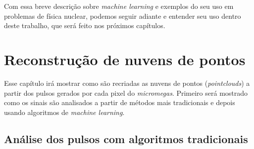 \documentclass[a4paper,12pt,oneside]{book}
\begin{document}



\par Com essa breve descrição sobre \textit{machine learning} e exemplos do seu uso em problemas de física nuclear, podemos seguir adiante e entender seu uso dentro deste trabalho, que será feito nos próximos capítulos.

\chapter{Reconstrução de nuvens de pontos}\label{sec:sinais}

\par Esse capítulo irá mostrar como são recriadas as nuvens de pontos (\textit{pointclouds}) a partir dos pulsos gerados por cada pixel do \textit{micromegas}. Primeiro será mostrado como os sinais são analisados a partir de métodos mais tradicionais e depois usando algoritmos de \textit{machine learning}.



\par 

\section{Análise dos pulsos com algoritmos tradicionais}
\end{document}
